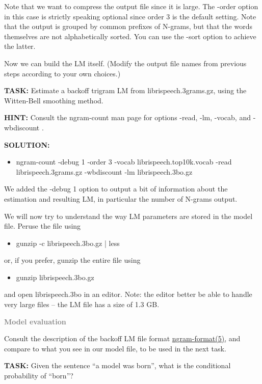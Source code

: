 Note that we want to compress the output file since it is large. The -order option in this case is strictly speaking optional since order 3 is the default setting. Note that the output is grouped by common prefixes of N-grams, but that the words themselves are not alphabetically sorted. You can use the -sort option to achieve the latter.

Now we can build the LM itself. (Modify the output file names from previous steps according to your own choices.)

{\bf TASK:} Estimate a backoff trigram LM from librispeech.3grams.gz, using the Witten-Bell smoothing method.

{\bf HINT:}  Consult the ngram-count man page for options -read, -lm, -vocab, and -wbdiscount .

{\bf SOLUTION:}
\begin{itemize}
	\item ngram-count -debug 1 -order 3 -vocab librispeech.top10k.vocab -read librispeech.3grams.gz -wbdiscount -lm librispeech.3bo.gz
\end{itemize}

We added the -debug 1 option to output a bit of information about the estimation and resulting LM, in particular the number of N-grams output.

We will now try to understand the way LM parameters are stored in the model file. Peruse the file using
\begin{itemize}
	\item gunzip -c librispeech.3bo.gz | less
\end{itemize}

or, if you prefer, gunzip the entire file using
\begin{itemize}
	\item gunzip librispeech.3bo.gz
\end{itemize}

and open librispeech.3bo in an editor. Note: the editor better be able to handle very large files – the LM file has a size of 1.3 GB.

{\bf \textcolor{gray}{Model evaluation}}

Consult the description of the backoff LM file format \href{http://www.speech.sri.com/projects/srilm/manpages/ngram-format.5.html}{ngram-format(5)}, and compare to what you see in our model file, to be used in the next task.

{\bf TASK:} Given the sentence “a model was born”, what is the conditional probability of “born”?

